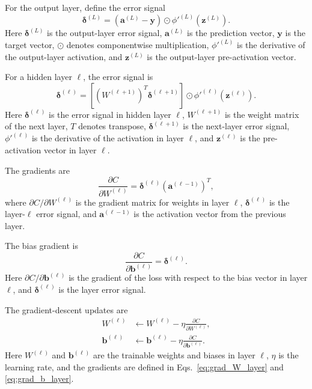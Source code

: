 \documentclass[11pt]{article}
\newcommand{\by}{\bm{y}}
\begin{document}
For the output layer, define the error signal
\begin{equation}
    \bm{\delta}^{(L)} = \left(\bm{a}^{(L)}-\by\right)\odot \phi'^{(L)}\left(\bm{z}^{(L)}\right).
    \label{eq:delta_output}
\end{equation}
Here $\bm{\delta}^{(L)}$ is the output-layer error signal, $\bm{a}^{(L)}$ is the prediction vector, $\by$ is the target vector, $\odot$ denotes componentwise multiplication, $\phi'^{(L)}$ is the derivative of the output-layer activation, and $\bm{z}^{(L)}$ is the output-layer pre-activation vector.

For a hidden layer $\ell$, the error signal is
\begin{equation}
    \bm{\delta}^{(\ell)} = \left[(W^{(\ell+1)})^T\bm{\delta}^{(\ell+1)}\right]\odot \phi'^{(\ell)}\left(\bm{z}^{(\ell)}\right).
    \label{eq:delta_hidden}
\end{equation}
Here $\bm{\delta}^{(\ell)}$ is the error signal in hidden layer $\ell$, $W^{(\ell+1)}$ is the weight matrix of the next layer, $T$ denotes transpose, $\bm{\delta}^{(\ell+1)}$ is the next-layer error signal, $\phi'^{(\ell)}$ is the derivative of the activation in layer $\ell$, and $\bm{z}^{(\ell)}$ is the pre-activation vector in layer $\ell$.

The gradients are
\begin{equation}
    \frac{\partial C}{\partial W^{(\ell)}} = \bm{\delta}^{(\ell)}\left(\bm{a}^{(\ell-1)}\right)^T,
    \label{eq:grad_W_layer}
\end{equation}
where $\partial C/\partial W^{(\ell)}$ is the gradient matrix for weights in layer $\ell$, $\bm{\delta}^{(\ell)}$ is the layer-$\ell$ error signal, and $\bm{a}^{(\ell-1)}$ is the activation vector from the previous layer.

The bias gradient is
\begin{equation}
    \frac{\partial C}{\partial \bm{b}^{(\ell)}} = \bm{\delta}^{(\ell)}.
    \label{eq:grad_b_layer}
\end{equation}
Here $\partial C/\partial \bm{b}^{(\ell)}$ is the gradient of the loss with respect to the bias vector in layer $\ell$, and $\bm{\delta}^{(\ell)}$ is the layer error signal.

The gradient-descent updates are
\begin{align}
    W^{(\ell)} &\leftarrow W^{(\ell)} - \eta \frac{\partial C}{\partial W^{(\ell)}}, \label{eq:update_W_layer}\\
    \bm{b}^{(\ell)} &\leftarrow \bm{b}^{(\ell)} - \eta \frac{\partial C}{\partial \bm{b}^{(\ell)}}. \label{eq:update_b_layer}
\end{align}
Here $W^{(\ell)}$ and $\bm{b}^{(\ell)}$ are the trainable weights and biases in layer $\ell$, $\eta$ is the learning rate, and the gradients are defined in Eqs.~\eqref{eq:grad_W_layer} and \eqref{eq:grad_b_layer}.
\end{document}
